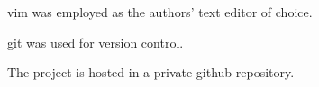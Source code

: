vim was employed as the authors' text editor of choice.

git was used for version control.

The project is hosted in a private github repository.
